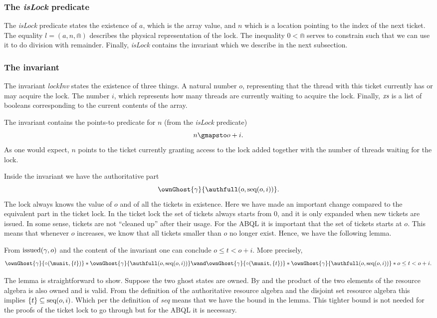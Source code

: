 \subsubsection{The \textit{isLock} predicate}

The \textit{isLock} predicate states the existence of $a$, which is the array
value, and $n$ which is a location pointing to the index of the next ticket. The
equality $l = (a, n, \Cap)$ describes the physical representation of the lock.
The inequality $ 0 < \Cap $ serves to constrain \Cap such that we can use it to
do division with remainder. Finally, \textit{isLock} contains the invariant
which we describe in the next subsection.

\subsubsection{The invariant}

The invariant \textit{lockInv} states the existence of three things. A natural number $o$,
representing that the thread with this ticket currently has or may acquire the
lock. The number $i$, which represents how many threads are currently waiting to
acquire the lock. Finally, $\textit{xs}$ is a list of booleans corresponding to the
current contents of the array.

The invariant contains the points-to predicate for $n$ (from the \textit{isLock} predicate)
\[
  n \gmapsto o + i.
\]
As one would expect, $n$ points to the ticket currently granting access to the
lock added together with the number of threads waiting for the lock.

Inside the invariant we have the authoritative part
\[
  \ownGhost{\gamma}{\authfull ( o, \seq(o, i))}.
\]
The lock always knows the value of $o$ and of all the tickets in existence. Here
we have made an important change compared to the equivalent part in the ticket
lock. In the ticket lock the set of tickets always starts from 0, and it is only
expanded when new tickets are issued. In some sense, tickets are not ``cleaned
up'' after their usage. For the ABQL it is important that the set of tickets
starts at $o$. This means that whenever $o$ increases, we know that all tickets
smaller than $o$ no longer exist. Hence, we have the following lemma.
\begin{lemma} \label{prop:ticketbound}
  From $\text{issued}(\gamma, o)$ and the content of the invariant one can conclude $o \leq t < o + i$.
  More precisely,
  \[
    \ownGhost{\gamma}{\circ(\munit, \{ t \})} \ast \ownGhost{\gamma}{\authfull(o, \seq(o, i))}
    \wand
    \ownGhost{\gamma}{\circ(\munit, \{ t \})} \ast \ownGhost{\gamma}{\authfull(o, \seq(o, i))}
    \ast o \leq t < o + i.
  \]
\end{lemma}
The lemma is straightforward to show. Suppose the two ghost states are owned. By
 and  the product of the two elements of the
resource algebra is also owned and is valid. From the definition of the
authoritative resource algebra and the disjoint set resource algebra this
implies $ \{ t \} \subseteq \text{seq}(o, i) $. Which per the definition of
\textit{seq} means that we have the bound in the lemma. This tighter bound is
not needed for the proofs of the ticket lock to go through but for the ABQL it
is necessary.

